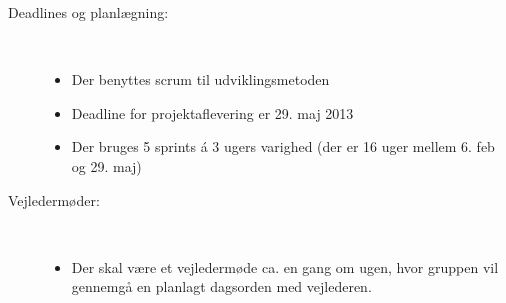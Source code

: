 \documentclass{memoir}
\begin{document}
\begin{description}
  \item[Deadlines og planlægning:] \hfill \\
  \begin{itemize}
  \item Der benyttes scrum til udviklingsmetoden
  \item Deadline for projektaflevering er 29. maj 2013
  \item Der bruges 5 sprints á 3 ugers varighed (der er 16 uger mellem 6. feb og 29. maj)
  \end{itemize}
  
  \item[Vejledermøder:] \hfill \\
  \begin{itemize}
    \item Der skal være et vejledermøde ca. en gang om ugen, hvor gruppen vil gennemgå en planlagt dagsorden med vejlederen.
  \end{itemize}
 
\end{description}
\end{document}
